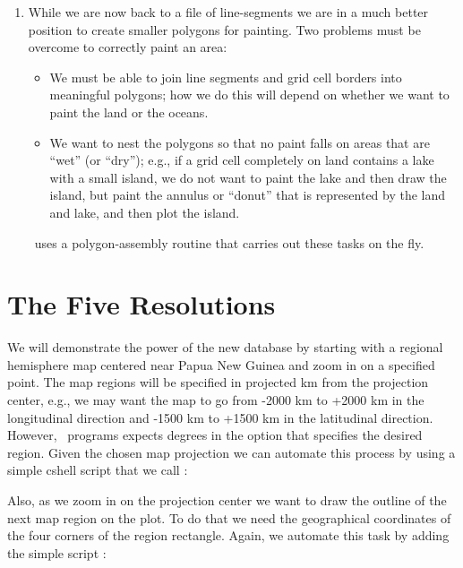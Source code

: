 \begin{enumerate}
\item While we are now back to a file of line-segments we are in
a much better position to create smaller polygons for painting.
Two problems must be overcome to correctly paint an area:

\begin{itemize}

\item We must be able to join line segments and grid cell borders
into meaningful polygons; how we do this will depend on whether
we want to paint the land or the oceans.

\item We want to nest the polygons so that no paint falls on areas
that are ``wet'' (or ``dry''); e.g., if a grid cell completely on
land contains a lake with a small island, we do not want to paint
the lake and then draw the island, but paint the annulus or ``donut''
that is represented by the land and lake, and then plot the island.

\end{itemize}

\GMT\ uses a polygon-assembly routine that carries out these
tasks on the fly.

\end{enumerate} 

\section{The Five Resolutions} 

We will demonstrate the power of the new database by starting with
a regional hemisphere map centered near Papua New Guinea and zoom
in on a specified point.  The map regions will be specified in
projected km from the projection center, e.g., we may want the
map to go from \mbox{-2000} km to \mbox{+2000} km in the longitudinal direction
and \mbox{-1500} km to +1500 km in the latitudinal direction.
However, \GMT\ programs expects degrees in the  option that
specifies the desired region.  Given the chosen map projection we
can automate this process by using a simple cshell script that we
call :


Also, as we zoom in on the projection center we want to draw the
outline of the next map region on the plot.  To do that we need
the geographical coordinates of the four corners of the region
rectangle.  Again, we automate this task by adding the simple
script :


